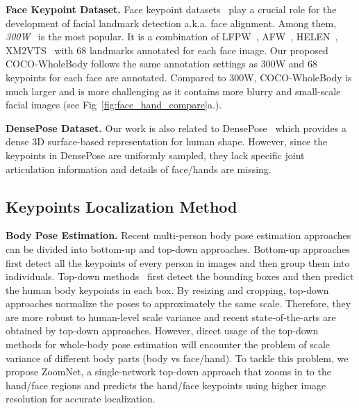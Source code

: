 \documentclass[runningheads]{llncs}
\begin{document}
	\textbf{Face Keypoint Dataset.} Face keypoint datasets~\cite{Burgos2013Robust,koestinger2011annotated,sagonas2013300,wu2018look} play a crucial role for the development of facial landmark detection a.k.a. face alignment. Among them, \emph{300W}~\cite{sagonas2013300} is the most popular. It is a combination of LFPW~\cite{belhumeur2013localizing}, AFW~\cite{zhu2012face}, HELEN~\cite{le2012interactive}, XM2VTS~\cite{messer1999xm2vtsdb} with 68 landmarks annotated for each face image. Our proposed COCO-WholeBody follows the same annotation settings as 300W and 68 keypoints for each face are annotated. Compared to 300W, COCO-WholeBody is much larger and is more challenging as it contains more blurry and small-scale facial images (see Fig~\ref{fig:face_hand_compare}a.). 
	
	\textbf{DensePose Dataset.}
	Our work is also related to DensePose~\cite{alp2018densepose} which provides a dense 3D surface-based representation for human shape. However, since the keypoints in DensePose are uniformly sampled, they lack specific joint articulation information and details of face/hands are missing.
	
	\subsection{Keypoints Localization Method}
	\textbf{Body Pose Estimation.} Recent multi-person body pose estimation approaches can be divided into bottom-up and top-down approaches. Bottom-up approaches \cite{cao2017realtime,Insafutdinov2016ArtTrack,Insafutdinov2016DeeperCut,Iqbal2016PoseTrack,jin2019multi,jin2017towards,newell2017associative,nie2017generative,papandreou2018personlab,pishchulin2016deepcut} first detect all the keypoints of every person in images and then group them into individuals. Top-down methods~\cite{chen2018cascaded,fang2017rmpe,he2017mask,liu2018cascaded,newell2016stacked,papandreou2017towards,sun2019deep,xiao2018simple} first detect the bounding boxes and then predict the human body keypoints in each box. By resizing and cropping, top-down approaches normalize the poses to approximately the same scale. Therefore, they are more robust to human-level scale variance and recent state-of-the-arts are obtained by top-down approaches. However, direct usage of the top-down methods for whole-body pose estimation will encounter the problem of scale variance of different body parts (body vs face/hand). To tackle this problem, we propose ZoomNet, a single-network top-down approach that zooms in to the hand/face regions and predicts the hand/face keypoints using higher image resolution for accurate localization.
	
\end{document}
